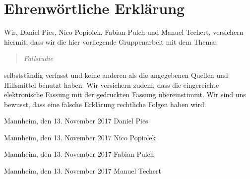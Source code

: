 
\clearpage
\chapter*{Ehrenwörtliche Erklärung}




Wir, Daniel Pies, Nico Popiolek, Fabian Pulch und Manuel Techert, versichern hiermit, dass wir die hier vorliegende Gruppenarbeit mit dem Thema:
 
\begin{quote}
	\textit{Fallstudie \DerTitelDerArbeit}
\end{quote}

selbstständig verfasst und keine anderen als die angegebenen Quellen und Hilfsmittel benutzt haben. Wir versichern zudem, dass die eingereichte elektronische Fassung mit der gedruckten Fassung übereinstimmt. Wir sind uns bewusst, dass eine falsche Erklärung rechtliche Folgen haben wird.

\vspace{2.2cm}
Mannheim, den 13. November 2017 \hfill Daniel Pies

\vspace{2.2cm}
Mannheim, den 13. November 2017 \hfill Nico Popiolek

\vspace{2.2cm}
Mannheim, den 13. November 2017 \hfill Fabian Pulch

\vspace{2.2cm}
Mannheim, den 13. November 2017 \hfill Manuel Techert
